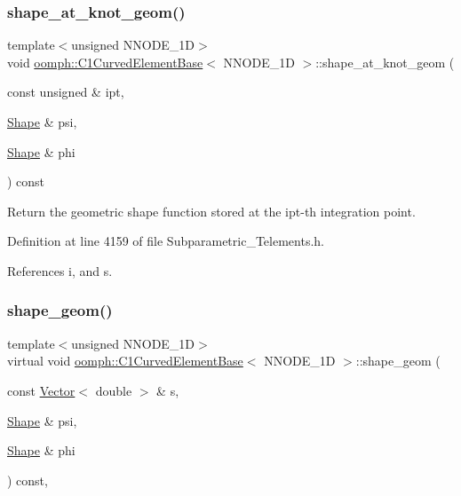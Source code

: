 \subsubsection{\texorpdfstring{shape\+\_\+at\+\_\+knot\+\_\+geom()}{shape\_at\_knot\_geom()}}
{\footnotesize\ttfamily template$<$unsigned N\+N\+O\+D\+E\+\_\+1D$>$ \\
void \hyperlink{classoomph_1_1C1CurvedElementBase}{oomph\+::\+C1\+Curved\+Element\+Base}$<$ N\+N\+O\+D\+E\+\_\+1D $>$\+::shape\+\_\+at\+\_\+knot\+\_\+geom (\begin{DoxyParamCaption}\item[{const unsigned \&}]{ipt,  }\item[{\hyperlink{classoomph_1_1Shape}{Shape} \&}]{psi,  }\item[{\hyperlink{classoomph_1_1Shape}{Shape} \&}]{phi }\end{DoxyParamCaption}) const\hspace{0.3cm}{\ttfamily [inline]}}



Return the geometric shape function stored at the ipt-\/th integration point. 



Definition at line 4159 of file Subparametric\+\_\+\+Telements.\+h.



References i, and s.

\mbox{\label{classoomph_1_1C1CurvedElementBase_ae8b0385cfb2eeeb2e17916d76d1e439e}} 
\subsubsection{\texorpdfstring{shape\+\_\+geom()}{shape\_geom()}}
{\footnotesize\ttfamily template$<$unsigned N\+N\+O\+D\+E\+\_\+1D$>$ \\
virtual void \hyperlink{classoomph_1_1C1CurvedElementBase}{oomph\+::\+C1\+Curved\+Element\+Base}$<$ N\+N\+O\+D\+E\+\_\+1D $>$\+::shape\+\_\+geom (\begin{DoxyParamCaption}\item[{const \hyperlink{classoomph_1_1Vector}{Vector}$<$ double $>$ \&}]{s,  }\item[{\hyperlink{classoomph_1_1Shape}{Shape} \&}]{psi,  }\item[{\hyperlink{classoomph_1_1Shape}{Shape} \&}]{phi }\end{DoxyParamCaption}) const\hspace{0.3cm}{\ttfamily [inline]}, {\ttfamily [virtual]}}



